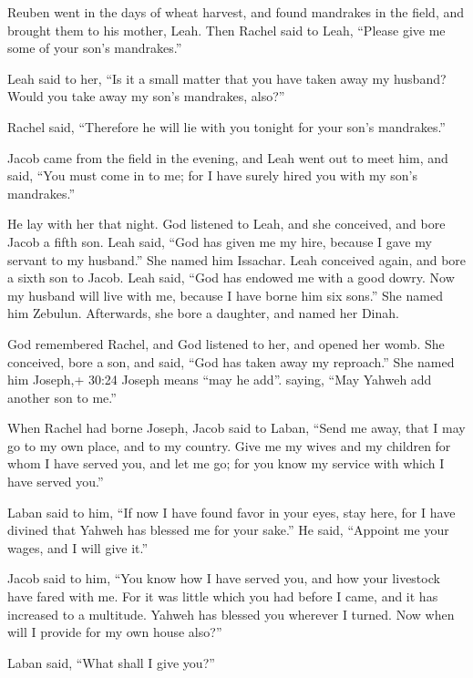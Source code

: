  Reuben went in the days of wheat harvest, and found
mandrakes in the field, and brought them to his mother, Leah. Then
Rachel said to Leah, ``Please give me some of your son's mandrakes.''

 Leah said to her, ``Is it a small matter that you have
taken away my husband? Would you take away my son's mandrakes, also?''

Rachel said, ``Therefore he will lie with you tonight for your son's
mandrakes.''

 Jacob came from the field in the evening, and Leah went
out to meet him, and said, ``You must come in to me; for I have surely
hired you with my son's mandrakes.''

He lay with her that night.  God listened to Leah, and she
conceived, and bore Jacob a fifth son.  Leah said, ``God
has given me my hire, because I gave my servant to my husband.'' She
named him Issachar.  Leah conceived again, and bore a sixth
son to Jacob.  Leah said, ``God has endowed me with a good
dowry. Now my husband will live with me, because I have borne him six
sons.'' She named him Zebulun.  Afterwards, she bore a
daughter, and named her Dinah.

 God remembered Rachel, and God listened to her, and opened
her womb.  She conceived, bore a son, and said, ``God has
taken away my reproach.''  She named him Joseph,+ 30:24
Joseph means ``may he add''. saying, ``May Yahweh add another son to
me.''

 When Rachel had borne Joseph, Jacob said to Laban, ``Send
me away, that I may go to my own place, and to my country. 
Give me my wives and my children for whom I have served you, and let me
go; for you know my service with which I have served you.''

 Laban said to him, ``If now I have found favor in your
eyes, stay here, for I have divined that Yahweh has blessed me for your
sake.''  He said, ``Appoint me your wages, and I will give
it.''

 Jacob said to him, ``You know how I have served you, and
how your livestock have fared with me.  For it was little
which you had before I came, and it has increased to a multitude. Yahweh
has blessed you wherever I turned. Now when will I provide for my own
house also?''

 Laban said, ``What shall I give you?''

